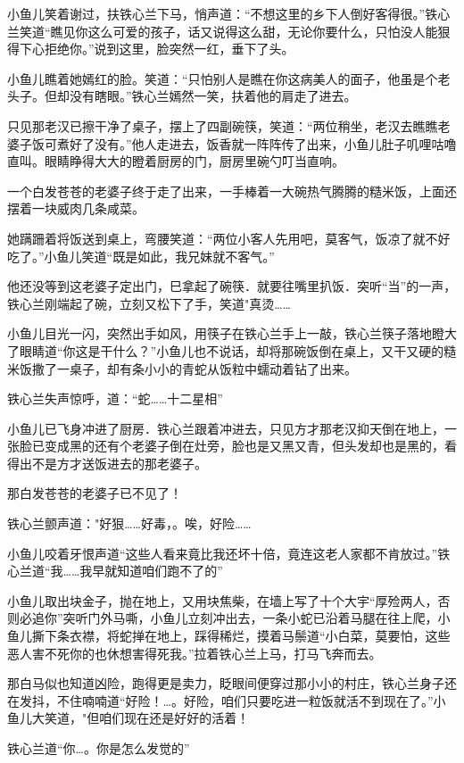 \documentclass[12pt,oneside]{book}
\begin{document}
小鱼儿笑着谢过，扶铁心兰下马，悄声道：``不想这里的乡下人倒好客得很。''铁心兰笑道``瞧见你这么可爱的孩子，话又说得这么甜，无论你要什么，只怕没人能狠得下心拒绝你。''说到这里，脸突然一红，垂下了头。

小鱼儿瞧着她嫣红的脸。笑道：``只怕别人是瞧在你这病美人的面子，他虽是个老头子。但却没有瞎眼。''铁心兰嫣然一笑，扶着他的肩走了进去。

只见那老汉已擦干净了桌子，摆上了四副碗筷，笑道：``两位稍坐，老汉去瞧瞧老婆子饭可煮好了没有。''他人走进去，饭香就一阵阵传了出来，小鱼儿肚子叽哩咕噜直叫。眼睛睁得大大的瞪着厨房的门，厨房里碗勺叮当直响。

一个白发苍苍的老婆子终于走了出来，一手棒着一大碗热气腾腾的糙米饭，上面还摆着一块威肉几条咸菜。

她蹒跚着将饭送到桌上，弯腰笑道：``两位小客人先用吧，莫客气，饭凉了就不好吃了。''小鱼儿笑道``既是如此，我兄妹就不客气。''

他还没等到这老婆子定出门，巳拿起了碗筷．就要往嘴里扒饭．突听``当''的一声，铁心兰刚端起了碗，立刻又松下了手，笑道"真烫\ldots\ldots{}

小鱼儿目光一闪，突然出手如风，用筷子在铁心兰手上一敲，铁心兰筷子落地瞪大了眼睛道``你这是干什么？''小鱼儿也不说话，却将那碗饭倒在桌上，又干又硬的糙米饭撒了一桌子，却有条小小的青蛇从饭粒中蠕动着钻了出来。

铁心兰失声惊呼，道：``蛇\ldots\ldots 十二星相''

小鱼儿已飞身冲进了厨房．铁心兰跟着冲进去，只见方才那老汉抑天倒在地上，一张脸已变成黑的还有个老婆子倒在灶旁，脸也是又黑又青，但头发却也是黑的，看得出不是方才送饭进去的那老婆子。

那白发苍苍的老婆子已不见了！

铁心兰颤声道："好狠\ldots\ldots 好毒，。唉，好险\ldots\ldots{}

小鱼儿咬着牙恨声道``这些人看来竟比我还坏十倍，竟连这老人家都不肯放过。''铁心兰道``我\ldots\ldots 我早就知道咱们跑不了的''

小鱼儿取出块金子，抛在地上，又用块焦柴，在墙上写了十个大宇``厚殓两人，否则必追你''突听门外马嘶，小鱼儿立刻冲出去，一条小蛇已沿着马腿在往上爬，小鱼儿撕下条衣襟，将蛇掸在地上，踩得稀烂，摸着马鬃道``小白菜，莫要怕，这些恶人害不死你的也休想害得死我。''拉着铁心兰上马，打马飞奔而去。

那白马似也知道凶险，跑得更是卖力，眨眼间便穿过那小小的村庄，铁心兰身子还在发抖，不住喃喃道``好险！\ldots。好险，咱们只要吃进一粒饭就活不到现在了。''小鱼儿大笑道，"但咱们现在还是好好的活着！

铁心兰道``你\ldots。你是怎么发觉的''
\end{document}

